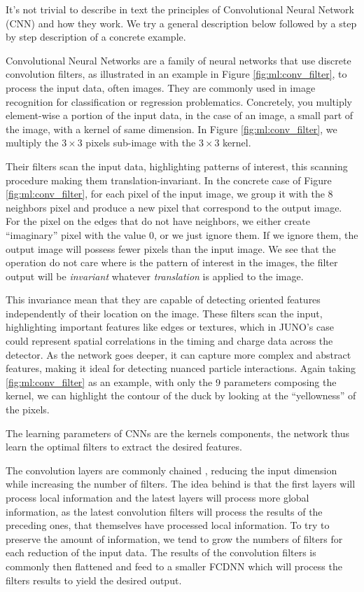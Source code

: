 \documentclass[../main.tex]{subfiles}
\begin{document}
It's not trivial to describe in text the principles of Convolutional Neural Network (CNN) and how they work. We try a general description below followed by a step by step description of a concrete example.

Convolutional Neural Networks are a family of neural networks that use discrete convolution filters, as illustrated in an example in Figure \ref{fig:ml:conv_filter}, to process the input data, often images. They are commonly used in image recognition \cite{russakovsky_imagenet_2015} for classification or regression problematics. Concretely, you multiply element-wise a portion of the input data, in the case of an image, a small part of the image, with a kernel of same dimension. In Figure \ref{fig:ml:conv_filter}, we multiply the $3\times3$ pixels sub-image with the $3\times3$ kernel.

Their filters scan the input data, highlighting patterns of interest, this scanning procedure making them translation-invariant. In the concrete case of Figure \ref{fig:ml:conv_filter}, for each pixel of the input image, we group it with the 8 neighbors pixel and produce a new pixel that correspond to the output image. For the pixel on the edges that do not have neighbors, we either create ``imaginary'' pixel with the value 0, or we just ignore them. If we ignore them, the output image will possess fewer pixels than the input image. We see that the operation do not care where is the pattern of interest in the images, the filter output will be \textit{invariant} whatever \textit{translation} is applied to the image.

This invariance mean that they are capable of detecting oriented features independently of their location on the image.
These filters scan the input, highlighting important features like edges or textures, which in JUNO's case could represent spatial correlations in the timing and charge data across the detector. As the network goes deeper, it can capture more complex and abstract features, making it ideal for detecting nuanced particle interactions.
Again taking \ref{fig:ml:conv_filter} as an example, with only the 9 parameters composing the kernel, we can highlight the contour of the duck by looking at the ``yellowness'' of the pixels.

The learning parameters of CNNs are the kernels components, the network thus learn the optimal filters to extract the desired features.

The convolution layers are commonly chained \cite{simonyan_very_2015}, reducing the input dimension while increasing the number of filters. The idea behind is that the first layers will process local information and the latest layers will process more global information, as the latest convolution filters will process the results of the preceding ones, that themselves have processed local information. To try to preserve the amount of information, we tend to grow the numbers of filters for each reduction of the input data.
The results of the convolution filters is commonly then flattened and feed to a smaller FCDNN which will process the filters results to yield the desired output.
\end{document}
